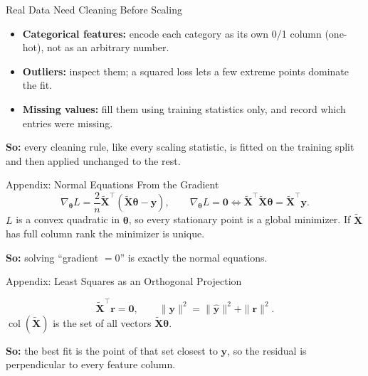 \documentclass{ntuabeamer}
\newcommand{\takeaway}[1]{\par\vspace{0.3cm}\begingroup\raggedright\noindent
  {\color{courseblue}\textbf{So:}} #1\par\endgroup}
\begin{document}
\begin{frame}{Real Data Need Cleaning Before Scaling}
  \begin{itemize}
    \item \textbf{Categorical features:} encode each category as its own 0/1 column (one-hot), not as an arbitrary number.
    \item \textbf{Outliers:} inspect them; a squared loss lets a few extreme points dominate the fit.
    \item \textbf{Missing values:} fill them using training statistics only, and record which entries were missing.
  \end{itemize}
  \takeaway{every cleaning rule, like every scaling statistic, is fitted on the training split and then applied unchanged to the rest.}
\end{frame}


\appendix
{}

\begin{frame}{Appendix: Normal Equations From the Gradient}
  \[
    \nabla_{\boldsymbol\theta}L=\frac2n\widetilde{\mathbf X}^\top(\widetilde{\mathbf X}\boldsymbol\theta-\mathbf y),
    \qquad
    \nabla_{\boldsymbol\theta}L=\mathbf 0
    \Longleftrightarrow
    \widetilde{\mathbf X}^\top\widetilde{\mathbf X}\boldsymbol\theta=\widetilde{\mathbf X}^\top\mathbf y .
  \]
  $L$ is a convex quadratic in $\boldsymbol\theta$, so every stationary point is a global minimizer.
  If $\widetilde{\mathbf X}$ has full column rank the minimizer is unique.
  \takeaway{solving ``gradient $=0$'' is exactly the normal equations.}
\end{frame}

\begin{frame}{Appendix: Least Squares as an Orthogonal Projection}
  \centering
  \[
    \widetilde{\mathbf X}^\top\mathbf r=\mathbf 0,
    \qquad
    \|\mathbf y\|^2=\|\hat{\mathbf y}\|^2+\|\mathbf r\|^2.
  \]
  $\operatorname{col}(\widetilde{\mathbf X})$ is the set of all vectors $\widetilde{\mathbf X}\boldsymbol\theta$.
  \takeaway{the best fit is the point of that set closest to $\mathbf y$, so the residual is perpendicular to every feature column.}
\end{frame}
\end{document}
